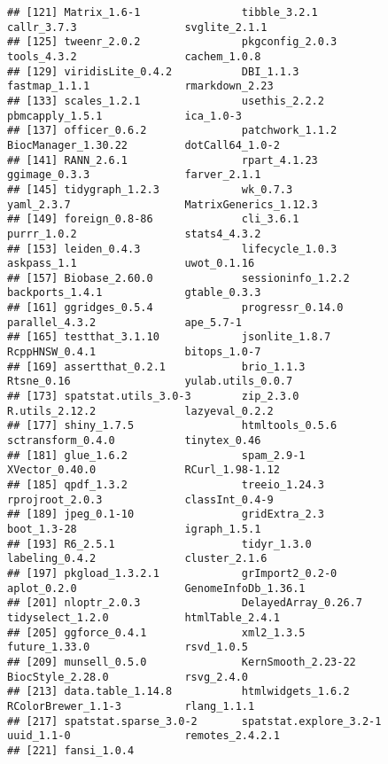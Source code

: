 \documentclass[
]{article}
\begin{document}
\begin{verbatim}
## [121] Matrix_1.6-1                tibble_3.2.1                callr_3.7.3                 svglite_2.1.1              
## [125] tweenr_2.0.2                pkgconfig_2.0.3             tools_4.3.2                 cachem_1.0.8               
## [129] viridisLite_0.4.2           DBI_1.1.3                   fastmap_1.1.1               rmarkdown_2.23             
## [133] scales_1.2.1                usethis_2.2.2               pbmcapply_1.5.1             ica_1.0-3                  
## [137] officer_0.6.2               patchwork_1.1.2             BiocManager_1.30.22         dotCall64_1.0-2            
## [141] RANN_2.6.1                  rpart_4.1.23                ggimage_0.3.3               farver_2.1.1               
## [145] tidygraph_1.2.3             wk_0.7.3                    yaml_2.3.7                  MatrixGenerics_1.12.3      
## [149] foreign_0.8-86              cli_3.6.1                   purrr_1.0.2                 stats4_4.3.2               
## [153] leiden_0.4.3                lifecycle_1.0.3             askpass_1.1                 uwot_0.1.16                
## [157] Biobase_2.60.0              sessioninfo_1.2.2           backports_1.4.1             gtable_0.3.3               
## [161] ggridges_0.5.4              progressr_0.14.0            parallel_4.3.2              ape_5.7-1                  
## [165] testthat_3.1.10             jsonlite_1.8.7              RcppHNSW_0.4.1              bitops_1.0-7               
## [169] assertthat_0.2.1            brio_1.1.3                  Rtsne_0.16                  yulab.utils_0.0.7          
## [173] spatstat.utils_3.0-3        zip_2.3.0                   R.utils_2.12.2              lazyeval_0.2.2             
## [177] shiny_1.7.5                 htmltools_0.5.6             sctransform_0.4.0           tinytex_0.46               
## [181] glue_1.6.2                  spam_2.9-1                  XVector_0.40.0              RCurl_1.98-1.12            
## [185] qpdf_1.3.2                  treeio_1.24.3               rprojroot_2.0.3             classInt_0.4-9             
## [189] jpeg_0.1-10                 gridExtra_2.3               boot_1.3-28                 igraph_1.5.1               
## [193] R6_2.5.1                    tidyr_1.3.0                 labeling_0.4.2              cluster_2.1.6              
## [197] pkgload_1.3.2.1             grImport2_0.2-0             aplot_0.2.0                 GenomeInfoDb_1.36.1        
## [201] nloptr_2.0.3                DelayedArray_0.26.7         tidyselect_1.2.0            htmlTable_2.4.1            
## [205] ggforce_0.4.1               xml2_1.3.5                  future_1.33.0               rsvd_1.0.5                 
## [209] munsell_0.5.0               KernSmooth_2.23-22          BiocStyle_2.28.0            rsvg_2.4.0                 
## [213] data.table_1.14.8           htmlwidgets_1.6.2           RColorBrewer_1.1-3          rlang_1.1.1                
## [217] spatstat.sparse_3.0-2       spatstat.explore_3.2-1      uuid_1.1-0                  remotes_2.4.2.1            
## [221] fansi_1.0.4
\end{verbatim}
\end{document}
